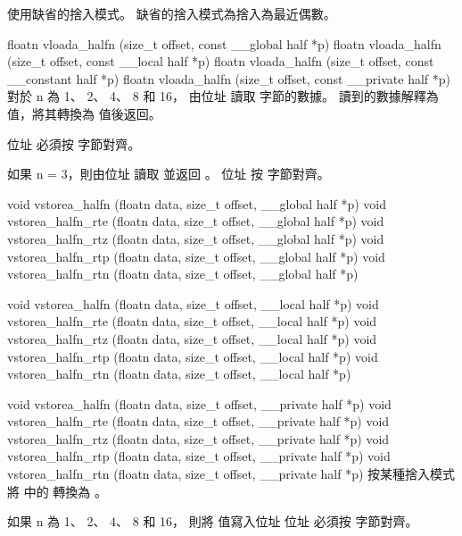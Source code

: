  使用缺省的捨入模式。
缺省的捨入模式為捨入為最近偶數。
\stopbuffer

floatn vloada_halfn (size_t offset,
	const __global half *p)
floatn vloada_halfn (size_t offset,
	const __local half *p)
floatn vloada_halfn (size_t offset,
	const __constant half *p)
floatn vloada_halfn (size_t offset,
	const __private half *p)
\stopbuffer
{}
對於 n 為 1、 2、 4、 8 和 16，
由位址  讀取
  字節的數據。
讀到的數據解釋為  值，將其轉換為  值後返回。

位址  必須按
  字節對齊。

如果 n = 3，則由位址  讀取
  並返回 。
位址  按
  字節對齊。
\stopbuffer

void vstorea_halfn (floatn data,
	size_t offset,
	__global half *p)
void vstorea_halfn_rte (floatn data,
	size_t offset,
	__global half *p)
void vstorea_halfn_rtz (floatn data,
	size_t offset,
	__global half *p)
void vstorea_halfn_rtp (floatn data,
	size_t offset,
	__global half *p)
void vstorea_halfn_rtn (floatn data,
	size_t offset,
	__global half *p)

void vstorea_halfn (floatn data,
	size_t offset,
	__local half *p)
void vstorea_halfn_rte (floatn data,
	size_t offset,
	__local half *p)
void vstorea_halfn_rtz (floatn data,
	size_t offset,
	__local half *p)
void vstorea_halfn_rtp (floatn data,
	size_t offset,
	__local half *p)
void vstorea_halfn_rtn (floatn data,
	size_t offset,
	__local half *p)

void vstorea_halfn (floatn data,
	size_t offset,
	__private half *p)
void vstorea_halfn_rte (floatn data,
	size_t offset,
	__private half *p)
void vstorea_halfn_rtz (floatn data,
	size_t offset,
	__private half *p)
void vstorea_halfn_rtp (floatn data,
	size_t offset,
	__private half *p)
void vstorea_halfn_rtn (floatn data,
	size_t offset,
	__private half *p)
\stopbuffer
{}
按某種捨入模式將  中的  轉換為 。

如果 n 為 1、 2、 4、 8 和 16，
則將  值寫入位址 
位址  必須按
  字節對齊。

